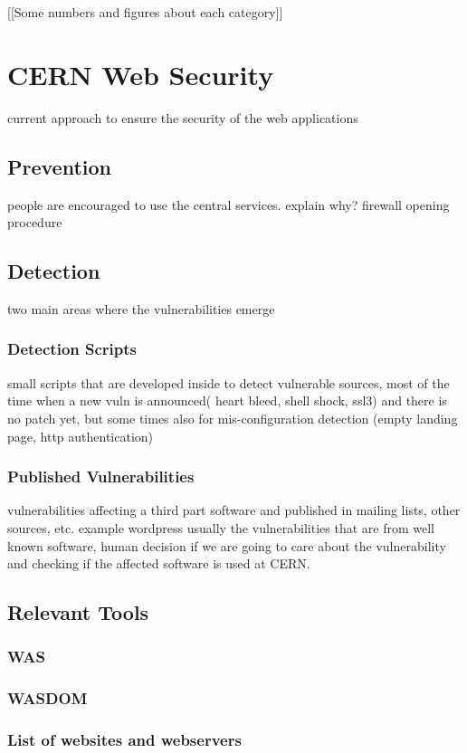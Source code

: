 [[Some numbers and figures about each category]]


\section{CERN Web Security}
current approach to ensure the security of the web applications
\subsection{Prevention}
people are encouraged to use the central services. explain why?
firewall opening procedure

\subsection{Detection}
two main areas where the vulnerabilities emerge
\subsubsection{Detection Scripts}
small scripts that are developed inside to detect vulnerable sources, most of the time when a new vuln is announced( heart bleed, shell shock, ssl3) and there is no patch yet, but some times also for mis-configuration detection (empty landing page, http authentication)
\subsubsection{Published Vulnerabilities}
vulnerabilities affecting a third part software and published in mailing lists, other sources, etc. example wordpress
usually the vulnerabilities that are from well known software, human decision if we are going to care about the vulnerability and checking if the affected software is used at CERN.

\subsection{Relevant Tools}
\subsubsection{WAS}
\subsubsection{WASDOM}
\subsubsection{List of websites and webservers}
